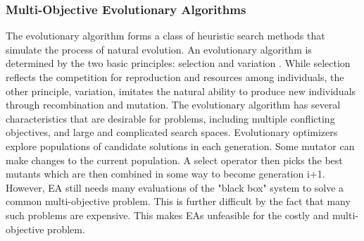 

            \subsubsection{Multi-Objective Evolutionary Algorithms}
            The evolutionary algorithm forms a class of heuristic search methods that simulate the process of natural evolution. An evolutionary algorithm is determined by the two basic principles: selection and variation \cite{TutMOEABrockhoff}. While selection reflects the competition for reproduction and resources among individuals, the other principle, variation, imitates the natural ability to produce new individuals through recombination and mutation. 
            The evolutionary algorithm has several characteristics that are desirable for problems, including multiple conflicting objectives, and large and complicated search spaces. Evolutionary optimizers explore populations of candidate solutions in each generation. Some mutator can make changes to the current population. A select operator then picks the best mutants which are then combined in some way to become generation i+1. However, EA still needs many evaluations of the "black box" system to solve a common multi-objective problem. This is further difficult by the fact that many such problems are expensive. This makes EAs unfeasible for the costly and multi-objective problem. 



